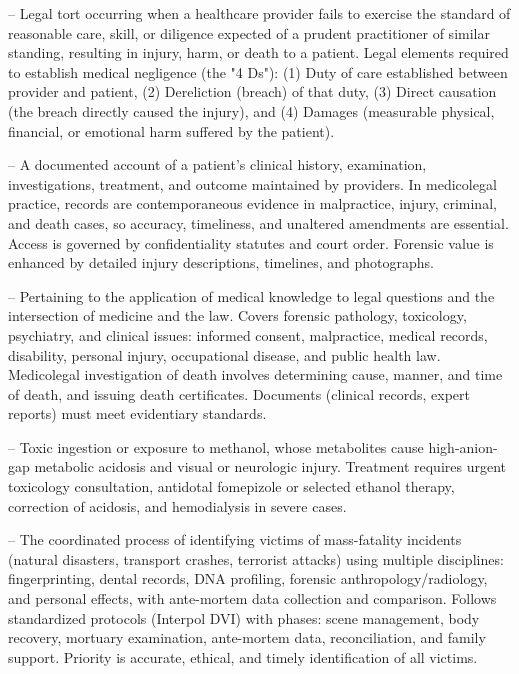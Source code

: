-- Legal tort occurring when a healthcare provider fails to exercise the standard of reasonable care, skill, or diligence expected of a prudent practitioner of similar standing, resulting in injury, harm, or death to a patient. Legal elements required to establish medical negligence (the "4 Ds"): (1) Duty of care established between provider and patient, (2) Dereliction (breach) of that duty, (3) Direct causation (the breach directly caused the injury), and (4) Damages (measurable physical, financial, or emotional harm suffered by the patient).


-- A documented account of a patient's clinical history, examination, investigations, treatment, and outcome maintained by providers. In medicolegal practice, records are contemporaneous evidence in malpractice, injury, criminal, and death cases, so accuracy, timeliness, and unaltered amendments are essential. Access is governed by confidentiality statutes and court order. Forensic value is enhanced by detailed injury descriptions, timelines, and photographs.

-- Pertaining to the application of medical knowledge to legal questions and the intersection of medicine and the law. Covers forensic pathology, toxicology, psychiatry, and clinical issues: informed consent, malpractice, medical records, disability, personal injury, occupational disease, and public health law. Medicolegal investigation of death involves determining cause, manner, and time of death, and issuing death certificates. Documents (clinical records, expert reports) must meet evidentiary standards.

-- Toxic ingestion or exposure to methanol, whose metabolites cause high-anion-gap metabolic acidosis and visual or neurologic injury. Treatment requires urgent toxicology consultation, antidotal fomepizole or selected ethanol therapy, correction of acidosis, and hemodialysis in severe cases.

-- The coordinated process of identifying victims of mass-fatality incidents (natural disasters, transport crashes, terrorist attacks) using multiple disciplines: fingerprinting, dental records, DNA profiling, forensic anthropology/radiology, and personal effects, with ante-mortem data collection and comparison. Follows standardized protocols (Interpol DVI) with phases: scene management, body recovery, mortuary examination, ante-mortem data, reconciliation, and family support. Priority is accurate, ethical, and timely identification of all victims.

